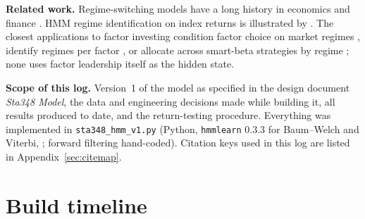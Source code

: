\documentclass[11pt]{article}
\begin{document}
\textbf{Related work.} Regime-switching models have a long history in economics and finance \citep{hamilton1989,ang2012}. HMM regime identification on index returns is illustrated by \citet{yuan2016}. The closest applications to factor investing condition factor choice on market regimes \citep{wang2020}, identify regimes per factor \citep{shu2024}, or allocate across smart-beta strategies by regime \citep{fons2021}; none uses factor leadership itself as the hidden state.

\textbf{Scope of this log.} Version~1 of the model as specified in the design document \emph{Sta348 Model}, the data and engineering decisions made while building it, all results produced to date, and the return-testing procedure. Everything was implemented in \texttt{sta348\_hmm\_v1.py} (Python, \texttt{hmmlearn} 0.3.3 for Baum--Welch and Viterbi, \citealp{hmmlearn}; forward filtering hand-coded). Citation keys used in this log are listed in Appendix~\ref{sec:citemap}.

\section{Build timeline}
\end{document}
